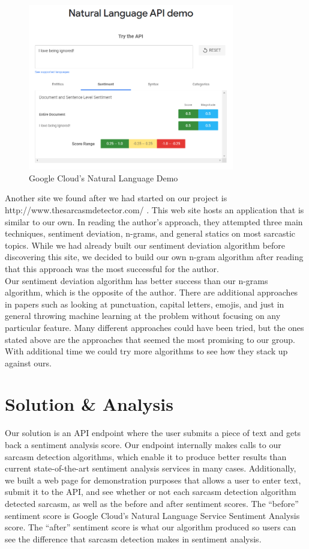 \documentclass[conference]{IEEEtran}
\begin{document}
\begin{figure}[htbp]
\centerline{\includegraphics[width=9cm]{image8.png}}
\caption{Google Cloud’s Natural Language Demo}
\label{fig6}
\end{figure}



Another site we found after we had started on our project is http://www.thesarcasmdetector.com/ \cite{b2}. This web site hosts an application that is similar to our own. In reading the author's approach, they attempted three main techniques, sentiment deviation, n-grams, and general statics on most sarcastic topics. While we had already built our sentiment deviation algorithm before discovering this site, we decided to build our own n-gram algorithm after reading that this approach was the most successful for the author.\\
Our sentiment deviation algorithm has better success than our n-grams algorithm, which is the opposite of the author. There are additional approaches in papers such as looking at punctuation, capital letters, emojis, and just in general throwing machine learning at the problem without focusing on any particular feature. Many different approaches could have been tried, but the ones stated above are the approaches that seemed the most promising to our group. With additional time we could try more algorithms to see how they stack up against ours.\\

\section{Solution \& Analysis}
Our solution is an API endpoint where the user submits a piece of text and gets back a sentiment analysis score. Our endpoint internally makes calls to our sarcasm detection algorithms, which enable it to produce better results than current state-of-the-art sentiment analysis services in many cases. Additionally, we built a web page for demonstration purposes that allows a user to enter text, submit it to the API, and see whether or not each sarcasm detection algorithm detected sarcasm, as well as the before and after sentiment scores. The “before” sentiment score is Google Cloud’s Natural Language Service Sentiment Analysis score. The “after” sentiment score is what our algorithm produced so users can see the difference that sarcasm detection makes in sentiment analysis.\\
\end{document}
